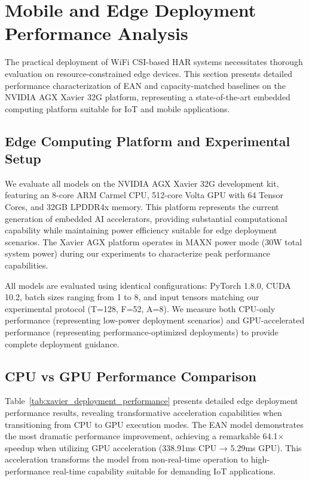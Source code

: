 \documentclass[lettersize,journal]{IEEEtran}
\begin{document}
\section{Mobile and Edge Deployment Performance Analysis}

The practical deployment of WiFi CSI-based HAR systems necessitates thorough evaluation on resource-constrained edge devices. This section presents detailed performance characterization of EAN and capacity-matched baselines on the NVIDIA AGX Xavier 32G platform, representing a state-of-the-art embedded computing platform suitable for IoT and mobile applications.

\subsection{Edge Computing Platform and Experimental Setup}

We evaluate all models on the NVIDIA AGX Xavier 32G development kit, featuring an 8-core ARM Carmel CPU, 512-core Volta GPU with 64 Tensor Cores, and 32GB LPDDR4x memory. This platform represents the current generation of embedded AI accelerators, providing substantial computational capability while maintaining power efficiency suitable for edge deployment scenarios. The Xavier AGX platform operates in MAXN power mode (30W total system power) during our experiments to characterize peak performance capabilities.

All models are evaluated using identical configurations: PyTorch 1.8.0, CUDA 10.2, batch sizes ranging from 1 to 8, and input tensors matching our experimental protocol (T=128, F=52, A=8). We measure both CPU-only performance (representing low-power deployment scenarios) and GPU-accelerated performance (representing performance-optimized deployments) to provide complete deployment guidance.

\subsection{CPU vs GPU Performance Comparison}

Table~\ref{tab:xavier_deployment_performance} presents detailed edge deployment performance results, revealing transformative acceleration capabilities when transitioning from CPU to GPU execution modes. The EAN model demonstrates the most dramatic performance improvement, achieving a remarkable 64.1× speedup when utilizing GPU acceleration (338.91ms CPU → 5.29ms GPU). This acceleration transforms the model from non-real-time operation to high-performance real-time capability suitable for demanding IoT applications.
\end{document}

